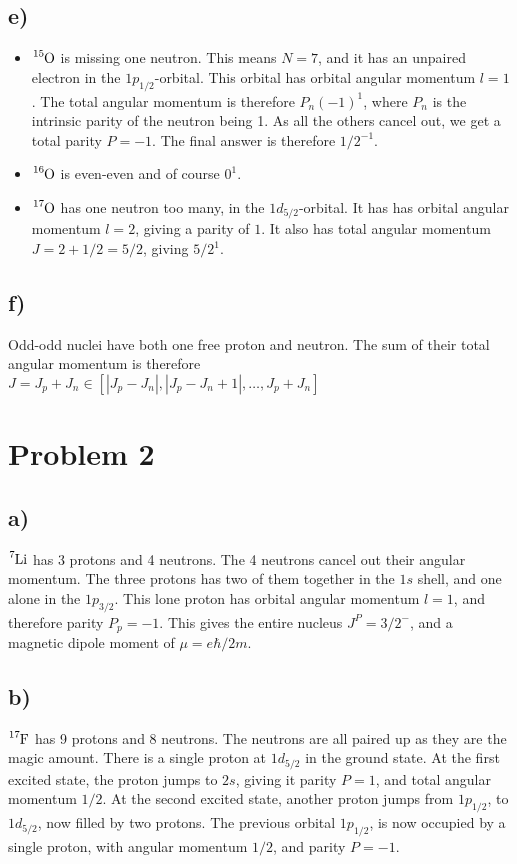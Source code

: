 \documentclass{article}
\begin{document}
\subsection*{e)}
\begin{itemize}
    \item $\ce{_{}^{15}\text{O}_{}}$ is missing one neutron. This means $N = 7$, and it has an unpaired electron in the $1p_{1/2}$-orbital. This orbital has orbital angular momentum $l = 1$. The total angular momentum is therefore $P_n(-1)^{1}$, where $P_n$ is the intrinsic parity of the neutron being 1. As all the others cancel out, we get a total parity $P = -1$. The final answer is therefore $1/   2^{-1}$.  
    \item $\ce{_{}^{16}\text{O}_{}}$ is even-even and of course $0^{1}$. 
    \item $\ce{_{}^{17}\text{O}_{}}$ has one neutron too many, in the $1d_{5/2}$-orbital. It has has orbital angular momentum $l = 2$, giving a parity of $1$. It also has total angular momentum $J = 2 + 1/2 = 5/2$, giving $5/2^{1}$. 
\end{itemize}

\subsection*{f)}
Odd-odd nuclei have both one free proton and neutron. The sum of their total angular momentum is therefore $J = J_p + J_n ∈ [\left|J_p - J_n\right|, \left|J_p - J_n + 1\right|, \ldots , J_p + J_n]$


\section*{Problem 2}
\subsection*{a)}
$\ce{_{}^{7}\text{Li}_{}}$ has 3 protons and 4 neutrons. The 4 neutrons cancel out their angular momentum. The three protons has two of them together in the $1s$ shell, and one alone in the $1p_{3/2}$. This lone proton has orbital angular momentum $l = 1$, and therefore parity $P_p = -1$. This gives the entire nucleus $J^{P} = 3/2^{-}$, and a magnetic dipole moment of $μ = eℏ/2m$. 

\subsection*{b)}
$\ce{_{}^{17}\text{F}_{}}$ has 9 protons and 8 neutrons. The neutrons are all paired up as they are the magic amount. There is a single proton at $1d_{5/2}$ in the ground state. At the first excited state, the proton jumps to $2s$, giving it parity $P=1$, and total angular momentum $1/2$. At the second excited state, another proton jumps from $1p_{1/2}$, to $1d_{5/2}$, now filled by two protons. The previous orbital $1p_{1/2}$, is now occupied by a single proton, with angular momentum $1/2$, and parity $P = -1$. 
\end{document}
